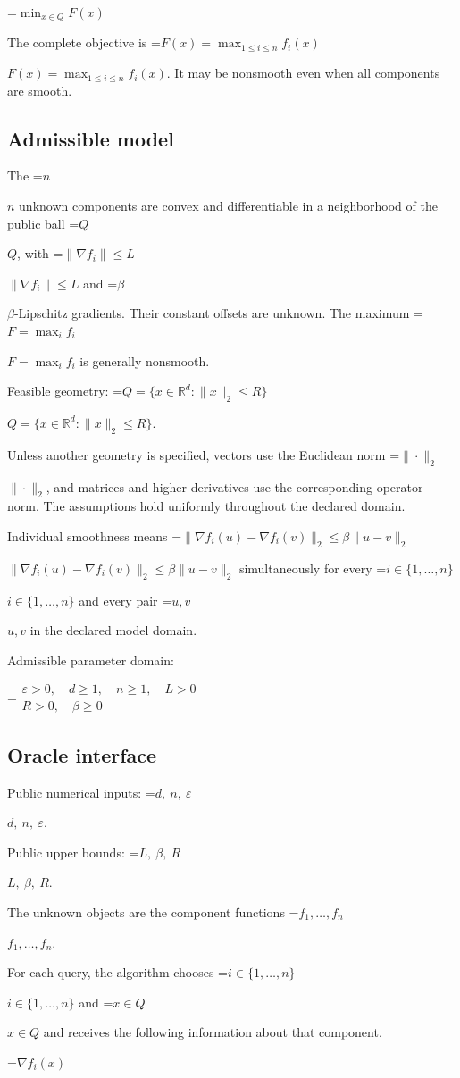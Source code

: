 \documentclass[10pt,a4paper]{article}
\newcommand{\AtlasMath}[1]{\par\begingroup\centering\setbox0=\hbox{$\displaystyle #1$}\ifdim\wd0>1.4\linewidth\typeout{ATLAS WIDE FORMULA: \the\wd0}\fi\ifdim\wd0>\linewidth\resizebox{\linewidth}{!}{\box0}\else\box0\fi\par\endgroup}
\newcommand{\AtlasInlineMath}[1]{\begingroup\setbox0=\hbox{$#1$}\ifdim\wd0>.4\linewidth\endgroup\AtlasMath{#1}\else\endgroup$#1$\fi}
\begin{document}
\AtlasMath{\min_{x\in Q}F(x)}


The complete objective is \AtlasInlineMath{F(x)=\max_{1\le i\le n}f_i(x)}. It may be nonsmooth even when all components are smooth.

\subsection{Admissible model}
The \AtlasInlineMath{n} unknown components are convex and differentiable in a neighborhood of the public ball \AtlasInlineMath{Q}, with \AtlasInlineMath{\|\nabla f_i\|\le L} and \AtlasInlineMath{\beta}-Lipschitz gradients. Their constant offsets are unknown. The maximum \AtlasInlineMath{F=\max_i f_i} is generally nonsmooth.

Feasible geometry: \AtlasInlineMath{Q=\{x\in\mathbb{R}^d:\|x\|_2\le R\}}.

Unless another geometry is specified, vectors use the Euclidean norm \AtlasInlineMath{\|\cdot\|_2}, and matrices and higher derivatives use the corresponding operator norm. The assumptions hold uniformly throughout the declared domain.

Individual smoothness means \AtlasInlineMath{\|\nabla f_i(u)-\nabla f_i(v)\|_2\le\beta\|u-v\|_2} simultaneously for every \AtlasInlineMath{i\in\{1,\ldots,n\}} and every pair \AtlasInlineMath{u,v} in the declared model domain.

Admissible parameter domain:


\AtlasMath{\begin{gathered}\varepsilon > 0,\quad d \ge 1,\quad n \ge 1,\quad L > 0\\R > 0,\quad \beta \ge 0\end{gathered}}


\subsection{Oracle interface}
Public numerical inputs: \AtlasInlineMath{d,\ n,\ \varepsilon}.

Public upper bounds: \AtlasInlineMath{L,\ \beta,\ R}.

The unknown objects are the component functions \AtlasInlineMath{f_1,\ldots,f_n}.

For each query, the algorithm chooses \AtlasInlineMath{i\in\{1,\ldots,n\}} and \AtlasInlineMath{x\in Q} and receives the following information about that component.


\AtlasMath{\nabla f_i(x)}
\end{document}
